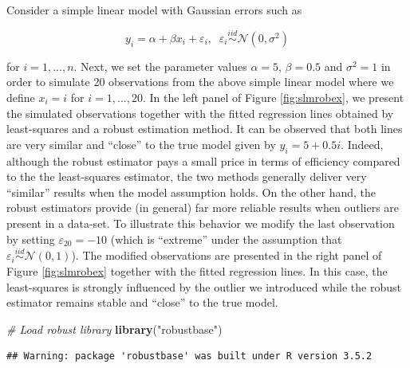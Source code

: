 \documentclass[]{book}
\newenvironment{Shaded}{\begin{snugshade}}{\end{snugshade}}
\newcommand{\KeywordTok}[1]{\textcolor[rgb]{0.13,0.29,0.53}{\textbf{#1}}}
\newcommand{\StringTok}[1]{\textcolor[rgb]{0.31,0.60,0.02}{#1}}
\newcommand{\CommentTok}[1]{\textcolor[rgb]{0.56,0.35,0.01}{\textit{#1}}}
\newcommand{\NormalTok}[1]{#1}
\theoremstyle{definition}
\theoremstyle{definition}
\theoremstyle{definition}
\theoremstyle{remark}
\let\BeginKnitrBlock\begin \let\EndKnitrBlock\end
\begin{document}
\BeginKnitrBlock{example}
\protect\hypertarget{exm:slmrobust}{}{\label{exm:slmrobust} } Consider a
simple linear model with Gaussian errors such as

\begin{equation}
        y_i = \alpha + \beta x_i + \varepsilon_i, \;\; \varepsilon_i \overset{iid}{\sim} \mathcal{N}(0,\sigma^2)
  \label{eq:exam}
\end{equation}

for \(i = 1,...,n\). Next, we set the parameter values \(\alpha = 5\),
\(\beta = 0.5\) and \(\sigma^2 = 1\) in order to simulate 20
observations from the above simple linear model where we define
\(x_i = i\) for \(i = 1,...,20\). In the left panel of Figure
\ref{fig:slmrobex}, we present the simulated observations together with
the fitted regression lines obtained by least-squares and a robust
estimation method. It can be observed that both lines are very similar
and ``close'' to the true model given by \(y_i = 5 + 0.5 i\). Indeed,
although the robust estimator pays a small price in terms of efficiency
compared to the the least-squares estimator, the two methods generally
deliver very ``similar'' results when the model assumption holds. On the
other hand, the robust estimators provide (in general) far more reliable
results when outliers are present in a data-set. To illustrate this
behavior we modify the last observation by setting
\(\varepsilon_{20} = -10\) (which is ``extreme'' under the assumption
that \(\varepsilon_i \overset{iid}{\sim} \mathcal{N}(0,1)\)). The
modified observations are presented in the right panel of Figure
\ref{fig:slmrobex} together with the fitted regression lines. In this
case, the least-squares is strongly influenced by the outlier we
introduced while the robust estimator remains stable and ``close'' to
the true model.
\EndKnitrBlock{example}

\begin{Shaded}
\begin{Highlighting}[]
\CommentTok{# Load robust library}
\KeywordTok{library}\NormalTok{(}\StringTok{"robustbase"}\NormalTok{)}
\end{Highlighting}
\end{Shaded}

\begin{verbatim}
## Warning: package 'robustbase' was built under R version 3.5.2
\end{verbatim}
\end{document}
